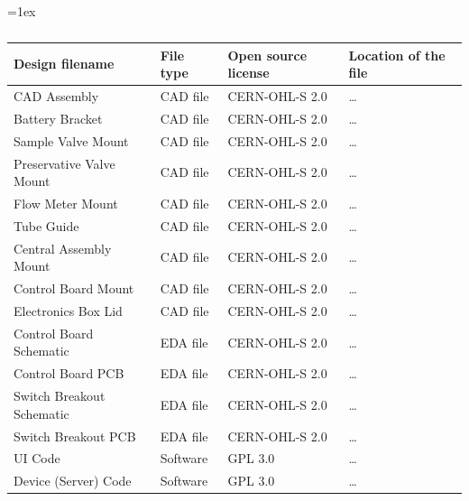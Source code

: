 \documentclass[11pt, letterpaper]{article}
\begin{document}
\begin{table}[H]
\vskip 0.1cm
\tabulinesep=1ex
\begin{tabu} to \linewidth {|X[l]|X[l]|X[1.5,1,l]|X[1.5,1,l]|} 
	\hline
	\textbf{Design filename} & \textbf{File type} & \textbf{Open source license} & \textbf{Location of the file} \\\hline
	
	CAD Assembly 				& CAD file & CERN-OHL-S 2.0 & \dots \\\hline
	Battery Bracket 			& CAD file & CERN-OHL-S 2.0 & \dots \\\hline
	Sample Valve Mount 			& CAD file & CERN-OHL-S 2.0 & \dots \\\hline
	Preservative Valve Mount 	& CAD file & CERN-OHL-S 2.0 & \dots \\\hline
	Flow Meter Mount 			& CAD file & CERN-OHL-S 2.0 & \dots \\\hline
	Tube Guide 					& CAD file & CERN-OHL-S 2.0 & \dots \\\hline
	Central Assembly Mount		& CAD file & CERN-OHL-S 2.0 & \dots \\\hline
	Control Board Mount 		& CAD file & CERN-OHL-S 2.0 & \dots \\\hline
	Electronics Box Lid			& CAD file & CERN-OHL-S 2.0 & \dots \\\hline %
	Control Board Schematic		& EDA file & CERN-OHL-S 2.0 & \dots \\\hline
	Control Board PCB			& EDA file & CERN-OHL-S 2.0 & \dots \\\hline
	Switch Breakout Schematic	& EDA file & CERN-OHL-S 2.0 & \dots \\\hline
	Switch Breakout PCB			& EDA file & CERN-OHL-S 2.0 & \dots \\\hline
	UI Code 					& Software & GPL 3.0 		& \dots \\\hline
	Device (Server) Code 		& Software & GPL 3.0 		& \dots \\\hline
\end{tabu}
\caption{}
\end{table}
\end{document}

